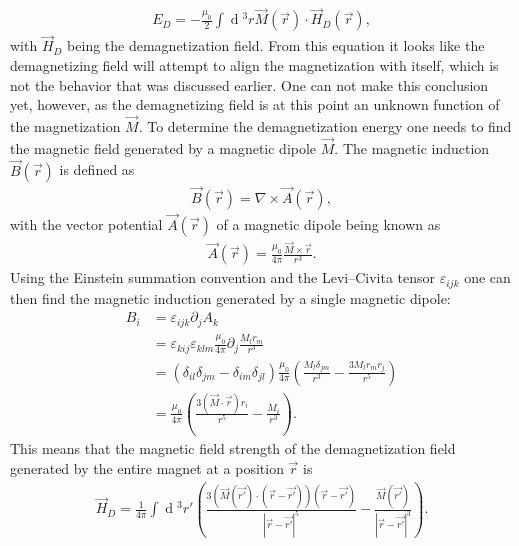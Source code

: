 \documentclass[12pt, a4paper, twoside, openright]{article}		%
\renewcommand{\d}[1]{\ensuremath{\operatorname{d}\!{#1}}}
\numberwithin{equation}{section}
\begin{document}
\begin{align}
\label{eq:demagenergy}
E_D = -\frac{\mu_0}{2}\int \d {^3}r \vec{M}(\vec{r})\cdot\vec{H}_D(\vec{r}),
\end{align}
with $\vec{H}_D$ being the demagnetization field. From this equation it looks like the demagnetizing field will attempt to align the magnetization with itself, which is not the behavior that was discussed earlier. One can not make this conclusion yet, however, as the demagnetizing field is at this point an unknown function of the magnetization $\vec{M}$. To determine the demagnetization energy one needs to find the magnetic field generated by a magnetic dipole $\vec{M}$. The magnetic induction $\vec{B}(\vec{r})$ is defined as
\begin{align}
\vec{B}(\vec{r}) = \nabla \times \vec{A}(\vec{r}),
\end{align}
with the vector potential $\vec{A}(\vec{r})$ of a magnetic dipole being known as
\begin{align}
\vec{A}(\vec{r}) = \frac{\mu_0}{4\pi}\frac{\vec{M}\times\vec{r}}{r^3}.
\end{align} 
Using the Einstein summation convention and the Levi--Civita tensor $\varepsilon_{ijk}$ one can then find the magnetic induction generated by a single magnetic dipole:
\begin{align*}
B_i &= \varepsilon_{ijk} \partial_j A_k \\
&= \varepsilon_{kij}\varepsilon_{klm} \frac{\mu_0}{4\pi}\partial_j\frac{M_l r_m}{r^3} \\
&= (\delta_{il}\delta_{jm}-\delta_{im}\delta_{jl})\frac{\mu_0}{4\pi}\left(\frac{M_l\delta_{jm}}{r^3}-\frac{3M_lr_mr_j}{r^5}\right) \\
&= \frac{\mu_0}{4\pi}\left(\frac{3(\vec{M}\cdot\vec{r})r_i}{r^5}-\frac{M_i}{r^3}\right).
\end{align*}
This means that the magnetic field strength of the demagnetization field generated by the entire magnet at a position $\vec{r}$ is
\begin{align}
\label{eq:demagfield}
\vec{H}_D = \frac{1}{4\pi} \int \d {^3}r' (\frac{3(\vec{M}(\vec{r'}) \cdot (\vec{r}-\vec{r'})) (\vec{r}-\vec{r'})}{|\vec{r}-\vec{r'}|^5}-\frac{\vec{M} (\vec{r'})}{|\vec{r}-\vec{r'}|^3}).
\end{align}
\end{document}

